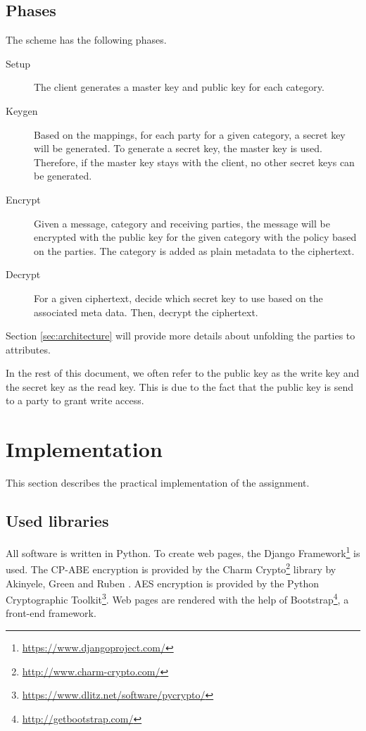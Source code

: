 \documentclass[a4paper]{article}
\begin{document}
	\subsection{Phases}
		The scheme has the following phases.
	
		\begin{description}
			\item[Setup]
			The client generates a master key and public key for each category.
			\item[Keygen]
			Based on the mappings, for each party for a given category, a secret key will be generated. To generate a secret key, the master key is used. Therefore, if the master key stays with the client, no other secret keys can be generated.
			\item[Encrypt]
			Given a message, category and receiving parties, the message will be encrypted with the public key for the given category with the policy based on the parties. The category is added as plain metadata to the ciphertext.
			\item[Decrypt]
			For a given ciphertext, decide which secret key to use based on the associated meta data. Then, decrypt the ciphertext.
		\end{description}
		
		Section \ref{sec:architecture} will provide more details about unfolding the parties to attributes.
		
		In the rest of this document, we often refer to the public key as the write key and the secret key as the read key. This is due to the fact that the public key is send to a party to grant write access.
    
\section{Implementation}
	This section describes the practical implementation of the assignment.
	
	\subsection{Used libraries}
		All software is written in Python. To create web pages, the Django Framework\footnote{\url{https://www.djangoproject.com/}} is used. The CP-ABE encryption is provided by the Charm Crypto\footnote{\url{http://www.charm-crypto.com/}} library by Akinyele, Green and Ruben \cite{cryptoeprint:2011:617}. AES encryption is provided by the Python Cryptographic Toolkit\footnote{\url{https://www.dlitz.net/software/pycrypto/}}. Web pages are rendered with the help of Bootstrap\footnote{\url{http://getbootstrap.com/}}, a front-end framework.
	
\end{document}
